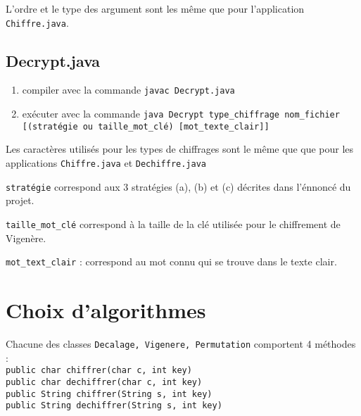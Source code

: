 \documentclass{article}
\begin{document}
L'ordre et le type des argument sont les même que pour l'application \texttt{Chiffre.java}. \\
\vspace{2\baselineskip}

\subsection{Decrypt.java}
\vspace{1\baselineskip}

\begin{enumerate}
\item compiler avec la commande \texttt{javac Decrypt.java}
\item exécuter avec la commande \texttt{java Decrypt type\_chiffrage nom\_fichier [(stratégie ou taille\_mot\_clé) [mot\_texte\_clair]]}
\end{enumerate}
\vspace{1\baselineskip}

Les caractères utilisés pour les types de chiffrages sont le même que que pour les applications \texttt{Chiffre.java} et \texttt{Dechiffre.java} \\
\vspace{1\baselineskip}

\texttt{stratégie} correspond aux 3 stratégies (a), (b) et (c) décrites dans l'énnoncé du projet.
\vspace{1\baselineskip}

\texttt{taille\_mot\_clé} correspond à la taille de la clé utilisée pour le chiffrement de Vigenère. \\
\vspace{1\baselineskip}

\texttt{mot\_text\_clair} : correspond au mot connu qui se trouve dans le texte clair. \\
\vspace{2\baselineskip}

\color{cyan}\section{Choix d'algorithmes}
\color{black}
\vspace{1\baselineskip}

Chacune des classes \texttt{Decalage, Vigenere, Permutation} comportent 4 méthodes : \\
\texttt{public char chiffrer(char c, int key)} \\
\texttt{public char dechiffrer(char c, int key)} \\
\texttt{public String chiffrer(String s, int key)} \\
\texttt{public String dechiffrer(String s, int key)} \\
\vspace{1\baselineskip}
\end{document}
